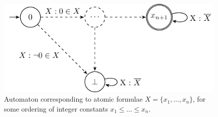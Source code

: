 \begin{figure}[h!]
 \begin{center}
  \includegraphics{fig/atomic-set-is-X}
 \end{center}
 \caption{Automaton corresponding to atomic formulae $X = \{x_1,\ldots,x_n\}$,
 for some ordering of integer constants $x_1 \leq \ldots \leq x_n$.}
\end{figure}


